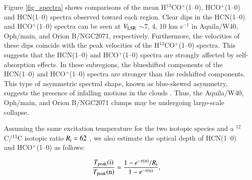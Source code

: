 \documentclass{aa}
\begin{document}
Figure \ref{fig_spectra} shows comparisons of the mean H$^{13}$CO$^+$(1--0), HCO$^{+}$(1--0) and HCN(1--0) spectra observed toward each region. 
Clear dips in the HCN(1--0) and HCO$^{+}$(1--0) spectra can be seen at $V_{\rm LSR}$ $\sim$7, 4, 10 km s$^{-1}$ in Aquila/W40, Oph/main, 
and Orion B/NGC2071, respectively.
Furthermore, the velocities of these dips coincide with the peak velocities of the H$^{13}$CO$^+$(1--0) spectra. 
This suggests that the HCN(1--0) and HCO$^{+}$(1--0) spectra are strongly affected by self-absorption effects. 
In these subregions, the blueshifted components of the HCN(1--0) and HCO$^+$(1--0) spectra 
are stronger than the redshifted components. 
This type of asymmetric spectral shape, known as blue-skewed asymmetry, 
suggests the presence of infalling motions in the clouds \citep[cf.][]{Myers96,Schneider10}. 
Thus, the Aquila/W40, Oph/main, and Orion B/NGC2071 clumps may be undergoing large-scale collapse. 



{Assuming the same excitation temperature for the two isotopic species and a $^{12}$C/$^{13}$C isotopic ratio 
$R_{\rm i} = 62$ 
\citep{Langer93}, we also estimate the optical depth of HCN(1--0) and HCO$^{+}$(1--0) as follows:}

{
\begin{equation}\label{eq:optical_depth}
\frac{T_{\rm peak}({\rm i})}{T_{\rm peak}({\rm n})} = \frac{1-e^{-\tau({\rm n})}/R_{\rm i}}{1-e^{-\tau({\rm n})}}, 
\end{equation}
}
\end{document}
